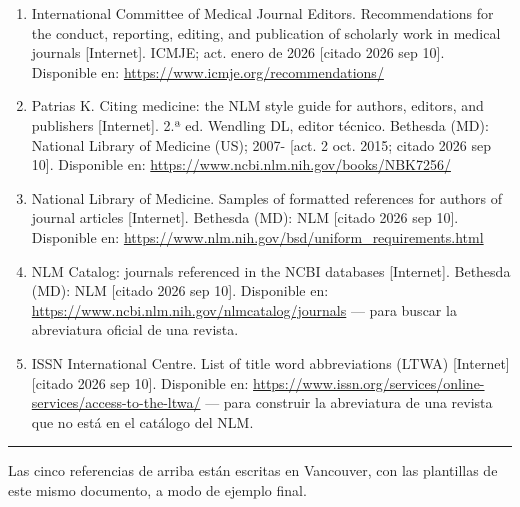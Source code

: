 \documentclass[11pt,a4paper]{article}
\newcommand{\anot}[1]{{\color{gris}\footnotesize #1}}
\begin{document}
\begin{enumerate}\setlength{\itemsep}{3pt}
\item International Committee of Medical Journal Editors. Recommendations for the conduct,
  reporting, editing, and publication of scholarly work in medical journals [Internet]. ICMJE;
  act. enero de 2026 [citado 2026 sep 10]. Disponible en:
  \url{https://www.icmje.org/recommendations/}
\item Patrias K. Citing medicine: the NLM style guide for authors, editors, and publishers
  [Internet]. 2.ª ed. Wendling DL, editor técnico. Bethesda (MD): National Library of
  Medicine (US); 2007- [act. 2 oct. 2015; citado 2026 sep 10]. Disponible en:
  \url{https://www.ncbi.nlm.nih.gov/books/NBK7256/}
\item National Library of Medicine. Samples of formatted references for authors of journal
  articles [Internet]. Bethesda (MD): NLM [citado 2026 sep 10]. Disponible en:
  \url{https://www.nlm.nih.gov/bsd/uniform_requirements.html}
\item NLM Catalog: journals referenced in the NCBI databases [Internet]. Bethesda (MD): NLM
  [citado 2026 sep 10]. Disponible en: \url{https://www.ncbi.nlm.nih.gov/nlmcatalog/journals}
  \anot{--- para buscar la abreviatura oficial de una revista.}
\item ISSN International Centre. List of title word abbreviations (LTWA) [Internet] [citado
  2026 sep 10]. Disponible en: \url{https://www.issn.org/services/online-services/access-to-the-ltwa/}
  \anot{--- para construir la abreviatura de una revista que no está en el catálogo del NLM.}
\end{enumerate}

\vspace{8pt}\hrule\vspace{4pt}
\anot{Las cinco referencias de arriba están escritas en Vancouver, con las plantillas de este
mismo documento, a modo de ejemplo final.}
\end{document}
